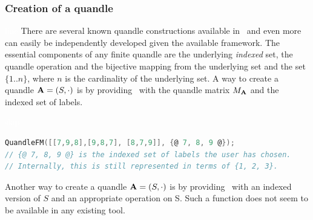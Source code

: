 \subsubsection{Creation of a quandle}\textcolor{white}{line}\newline
There are several known quandle constructions available in \Software~and even more can easily be independently developed given the available framework. The essential components of any finite quandle are the underlying \emph{indexed} set, the quandle operation and the bijective mapping from the underlying set and the set $\{1..n\}$, where $n$ is the cardinality of the underlying set. \newline
\noindent A way to create a quandle $\mathbf{A}=(S,\cdot)$ is by providing \Software~with
the quandle matrix $M_\mathbf{A}$ and the indexed set of labels.
\begin{example}\textcolor{white}{skip}\newline
\begin{lstlisting}[language=C]
QuandleFM([[7,9,8],[9,8,7], [8,7,9]], {@ 7, 8, 9 @}); 
// {@ 7, 8, 9 @} is the indexed set of labels the user has chosen.
// Internally, this is still represented in terms of {1, 2, 3}.
\end{lstlisting}
\end{example}
\noindent Another way to create a quandle $\mathbf{A}=(S,\cdot)$ is by providing \Software~with an indexed version of $S$ and an appropriate operation on S. Such a function does not seem to be available in any existing tool. 

